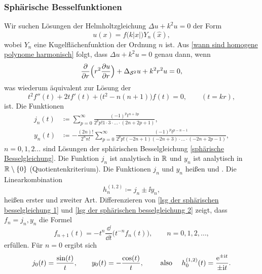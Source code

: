 \subsubsection*{Sphärische Besselfunktionen}
Wir suchen Lösungen der Helmholtzgleichung \(\Delta u+k^2u=0\) der Form
\begin{equation*}
	u(x)=f\big(k|x|\big)Y_n(\widehat{x}),
\end{equation*}
wobei \(Y_n\) eine Kugelflächenfunktion der Ordnung \(n\) ist. Aus \eqref{wann sind homogene polynome harmonisch} folgt, dass \(\Delta u+k^2u=0\) genau dann, wenn
\begin{equation*}
	\frac{\partial}{\partial r}\Big(r^2\frac{\partial u}{\partial r}\Big)+\Delta_{\mathcal{S}^2}u+k^2r^2u=0,
\end{equation*}
was wiederum äquivalent zur Lösung der 
\begin{equation}
	\label{sphärische Besselgleichung}
	t^2f''(t)+2tf'(t)+\big(t^2-n(n+1)\big)f(t)=0,\qquad (t=kr),
\end{equation}
ist. Die Funktionen
\begin{align}
	\label{lsg der sphärischen besselgleichung 1}
	j_n(t)&\coloneqq\sum_{p=0}^\infty\frac{(-1)^pt^{n+2p}}{2^pp!1\cdot3\cdot\ldots\cdot(2n+2p+1)},\\
	\label{lsg der sphärischen besselgleichung 2}
	y_n(t)&\coloneqq-\frac{(2n)!}{2^nn!}\sum_{p=0}^\infty\frac{(-1)^pt^{p-n-1}}{2^pp!(-2n+1)(-2n+3)\cdot\ldots\cdot(-2n+2p-1)},
\end{align}
\(n=0,1,2\ldots\) sind Lösungen der sphärischen Besselgleichung \eqref{sphärische Besselgleichung}. Die Funktion \(j_n\) ist analytisch in \(\mathbb{R}\) und \(y_n\) ist analytisch in \(\mathbb{R}\setminus\{0\}\) (Quotientenkriterium). Die Funktionen \(j_n\) und \(y_n\) heißen  und . Die Linearkombination
\begin{equation*}
	h_n^{(1,2)}\coloneqq j_n\pm\ii y_n,
\end{equation*}
heißen  erster und zweiter Art. Differenzieren von \eqref{lsg der sphärischen besselgleichung 1} und \eqref{lsg der sphärischen besselgleichung 2} zeigt, dass \(f_n=j_n,y_n\) die Formel
\begin{equation}
	\label{ableiten der hankelfkten}
	f_{n+1}(t)=-t^n\frac{\dd}{\dd t}\big(t^{-n}f_n(t)\big),\qquad n=0,1,2,\ldots,
\end{equation}
erfüllen. Für \(n=0\) ergibt sich 
\begin{equation*}
	j_0(t)=\frac{\sin(t)}{t},\qquad y_0(t)=-\frac{\cos(t)}{t},\qquad\text{ also }\quad h_0^{(1,2)}(t)=\frac{\mathrm{e}^{\pm\mathrm{i} t}}{\pm\mathrm{i} t}.
\end{equation*}
